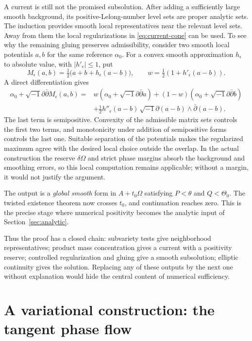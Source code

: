 \documentclass[12pt,reqno]{amsart}
\newcommand{\ii}{\sqrt{-1}}
\newcommand{\ddc}{\ii\partial\bar\partial}
\begin{document}
A current is still not the promised subsolution. After adding a sufficiently large smooth background, its positive-Lelong-number level sets are proper analytic sets. The induction provides smooth local representatives near the relevant level sets. Away from them the local regularizations in \eqref{eq:current-cone} can be used. To see why the remaining gluing preserves admissibility, consider two smooth local potentials $a,b$ for the same reference $\alpha_0$. For a convex smooth approximation $h_\epsilon$ to absolute value, with $|h'_\epsilon|\leq1$, put
\[
 M_\epsilon(a,b)=\tfrac12\bigl(a+b+h_\epsilon(a-b)\bigr),\qquad
 w=\tfrac12(1+h'_\epsilon(a-b)).
\]
A direct differentiation gives
\begin{align*}
 \alpha_0+\ddc M_\epsilon(a,b)
   ={}&w(\alpha_0+\ddc a)+(1-w)(\alpha_0+\ddc b)\\
      &+\tfrac12h''_\epsilon(a-b)\,
                \ii\partial(a-b)\wedge\bar\partial(a-b).
\end{align*}
The last term is semipositive. Convexity of the admissible matrix sets controls the first two terms, and monotonicity under addition of semipositive forms controls the last one. Suitable separation of the potentials makes the regularized maximum agree with the desired local choice outside the overlap. In the actual construction the reserve $\delta\Omega$ and strict phase margins absorb the background and smoothing errors, so this local computation remains applicable; without a margin, it would not justify the argument.

The output is a \emph{global smooth} form in $A+t_0\Omega$ satisfying $P<\theta$ and $Q<\Theta_0$. The twisted existence theorem now crosses $t_0$, and continuation reaches zero. This is the precise stage where numerical positivity becomes the analytic input of Section~\ref{sec:analytic}.

Thus the proof has a closed chain: subvariety tests give neighborhood representatives; product mass concentration gives a current with a positivity reserve; controlled regularization and gluing give a smooth subsolution; elliptic continuity gives the solution. Replacing any of these outputs by the next one without explanation would hide the central content of numerical sufficiency.

\section{A variational construction: the tangent phase flow}\label{sec:flow}
\end{document}
